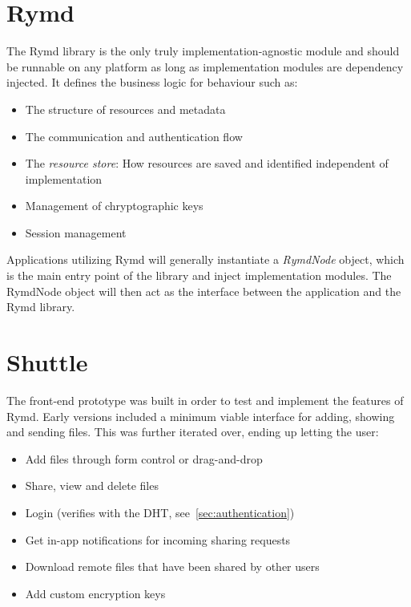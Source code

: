 \section{Rymd}
\label{sec:rymd}

The Rymd library is the only truly implementation-agnostic module and should be runnable on any platform as long as implementation modules are dependency injected.  It defines the business logic for behaviour such as:

\begin{itemize}
  \item The structure of resources and metadata
  \item The communication and authentication flow
  \item The \emph{resource store}: How resources are saved and identified independent of implementation
  \item Management of chryptographic keys
  \item Session management
\end{itemize}

Applications utilizing Rymd will generally instantiate a \emph{RymdNode} object, which is the main entry point of the library and inject implementation modules. The RymdNode object will then act as the interface between the application and the Rymd library.



\section{Shuttle}
\label{sec:shuttle}
The front-end prototype was built in order to test and implement the features of Rymd. Early versions included a minimum viable interface for adding, showing and sending files. This was further iterated over, ending up letting the user:

\begin{itemize}
  \item Add files through form control or drag-and-drop
  \item Share, view and delete files
  \item Login (verifies with the DHT, see~\ref{sec:authentication})
  \item Get in-app notifications for incoming sharing requests
  \item Download remote files that have been shared by other users
  \item Add custom encryption keys
\end{itemize}

